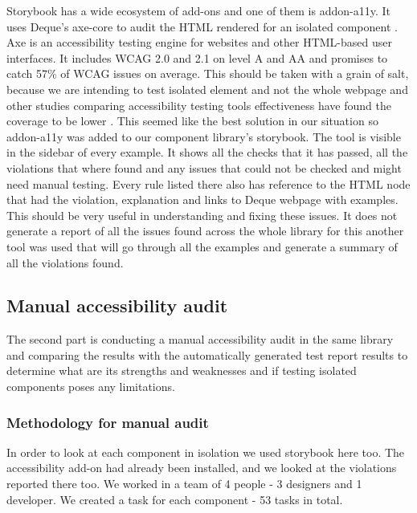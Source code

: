 \documentclass{master_thesis}
\begin{document}
Storybook has a wide ecosystem of add-ons and one of them is addon-a11y. It uses Deque's axe-core to audit the HTML rendered for an isolated component \citep{addon-a11y}. Axe is an accessibility testing engine for websites and other HTML-based user interfaces. It includes WCAG 2.0 and 2.1 on level A and AA and promises to catch 57\% of WCAG issues on average. \citep{Deque2023} This should be taken with a grain of salt, because we are intending to test isolated element and not the whole webpage and other studies comparing accessibility testing tools effectiveness have found the coverage to be lower  .
This seemed like the best solution in our situation so addon-a11y was added to our component library's storybook. The tool is visible in the sidebar of every example. It shows all the checks that it has passed, all the violations that where found and any issues that could not be checked and might need manual testing. Every rule listed there also has reference to the HTML node that had the violation, explanation and links to Deque webpage with examples. This should be very useful in understanding and fixing these issues.
It does not generate a report of all the issues found across the whole library for this another tool was used that will go through all the examples and generate a summary of all the violations found.


\subsection{Manual accessibility audit}

The second part is conducting a manual accessibility audit in the same library and comparing the results with the automatically generated test report results to determine what are its strengths and weaknesses and if testing isolated components poses any limitations.
\subsubsection{Methodology for manual audit}
In order to look at each component in isolation we used storybook here too. The accessibility add-on had already been installed, and we looked at the violations reported there too. We worked in a team of 4 people - 3 designers and 1 developer. We created a task for each component - 53 tasks in total.
\end{document}
